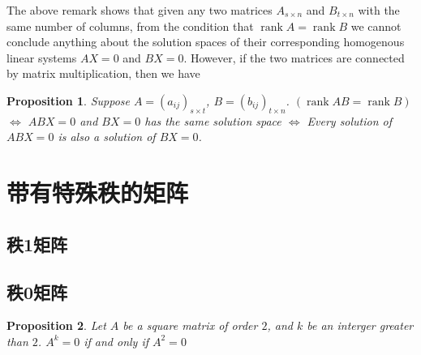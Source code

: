 \documentclass[onecolumn]{ctexart}
\newtheorem{proposition}{Proposition}
\DeclareMathOperator{\rank}{rank}
\begin{document}
The above remark shows that given any two matrices $A_{s \times n}$ and $B_{t 
\times n}$ with the same number of columns, from the condition that $\rank A = 
\rank B$ we cannot conclude anything about the solution spaces of their 
corresponding homogenous linear systems $AX = 0$ and $BX = 0$. However, if the 
two matrices are connected by matrix multiplication, then we have
\begin{proposition}
  Suppose $A = (a_{ij})_{s \times t}$, $B = (b_{ij})_{t \times n}$. $(\rank AB = 
  \rank B)$ $\Leftrightarrow$ $ABX = 0$ and $BX = 0$ has the same solution space 
  $\Leftrightarrow$ Every solution of $ABX = 0$ is also a solution of $BX = 0$.
\end{proposition}

\section{带有特殊秩的矩阵}

\subsection{秩1矩阵}

\subsection{秩0矩阵}

\begin{proposition}
  Let $A$ be a square matrix of order $2$, and $k$ be an interger greater than 
  $2$. $A^k = 0$ if and only if $A^2 = 0$
\end{proposition}
\end{document}
